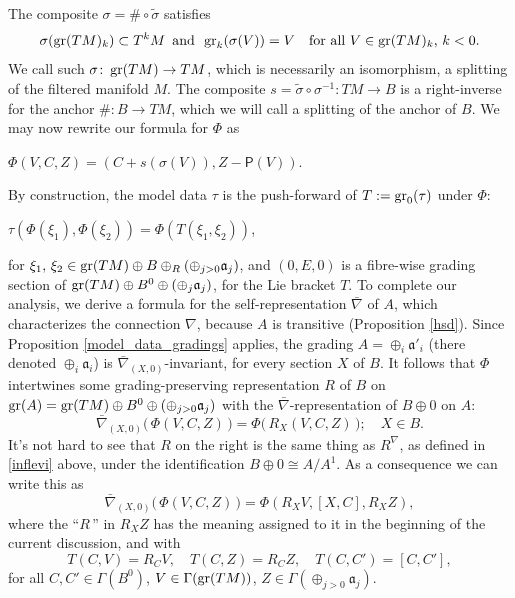 \documentclass[leqno,12pt]{amsart} %
\begin{document}
The composite $\sigma=\#\circ\tilde\sigma $ satisfies
\begin{equation*}
  \sigma(\operatorname{\operatorname{gr}}(TM)_k) \subset T^kM\enspace\text{and}\enspace
  \operatorname{\operatorname{gr}}_k(\sigma (V)) = V \quad\text{for all $V \in \operatorname{\operatorname{gr}}(TM)_k$, $k < 0$}.
\end{equation*}
We call such $\sigma \colon \operatorname{\operatorname{gr}}(TM) \rightarrow TM $, which is necessarily an
isomorphism, a {\df splitting} of the filtered manifold $M$. The composite
$s = \tilde \sigma \circ \sigma^{-1} \colon TM \rightarrow B$ is a right-inverse for the
anchor $\# \colon B \rightarrow TM$, which we will call a {\df splitting of the anchor of $B$}. We
may now rewrite our formula for $\Phi $ as
\begin{conditions}\item[{\bfseries S1.}]
  \quad $\Phi(V, C, Z) = (C + s(\sigma(V)), Z - \mathsf{P}(V))$.
\end{conditions}
By construction, the model data $\tau $ is the push-forward of $T:=\operatorname{\operatorname{gr}}_0(\tau)$ under
$\Phi $:
\begin{conditions}\item[{\bfseries S2.}]
  \quad $\tau(\Phi(\xi_1), \Phi(\xi_2)) = \Phi(T(\xi_1, \xi_2))$,
\end{conditions}
for $\xi_1,\,\xi_2 \in \operatorname{\operatorname{gr}}(TM)\oplus B \oplus_R(\oplus_{j>0}{\mathfrak a}_j)$, and
$(0, E, 0)$ is a fibre-wise grading section of
$\operatorname{\operatorname{gr}}(TM) \oplus B^0 \oplus (\oplus_j {\mathfrak a}_j)$, for the Lie bracket $T$.  To
complete our analysis, we derive a formula for the self-representation $\bar\nabla $ of
$A$, which characterizes the connection $\nabla$, because $A$ is transitive (Proposition
\ref{hsd}).  Since Proposition \ref{model_data_gradings} applies, the grading
$A=\oplus_i {\mathfrak a}'_i$ (there denoted $\oplus_i {\mathfrak a}_i$) is
$\bar\nabla_{(X,0)}$-invariant, for every section $X$ of $B$.  It follows that $\Phi $
intertwines some grading-preserving representation $R$ of $B$ on
$\operatorname{\operatorname{gr}}(A)=\operatorname{\operatorname{gr}}(TM)\oplus B^0 \oplus (\oplus_{j>0}{\mathfrak a}_j)$ with the
$\bar\nabla$-representation of $B \oplus 0$ on $A$:
\begin{equation*}
  \bar\nabla_{(X, 0)} \Big(\,\Phi(V,C,Z)\,\Big) = \Phi\Big(\,R_X(V, C, Z)\,\Big);\quad X \in B.
\end{equation*}
It's not hard to see that $R$ on the right is the same thing as $R^\nabla $, as defined in
\ref{inflevi} above, under the identification $B \oplus 0 \cong A/A^1$. As a consequence
we can write this as
\begin{equation}
    \bar\nabla_{(X, 0)} \Big(\,\Phi(V,C,Z)\,\Big)=\Phi(R_XV, [X,C], R_X Z),\label{groof}
\end{equation}
where the ``$R$\,'' in $R_XZ$ has the meaning assigned to it in the beginning of the
current discussion, and with
\begin{equation*}
  T(C, V) = R_C V,\quad
  T(C, Z) = R_C Z,\quad
  T(C, C') = [C,C'],
\end{equation*}
for all $C,C'\in\Gamma(B^0)$, $V\in \Gamma(\operatorname{\operatorname{gr}}(TM))$,
$Z \in \Gamma(\oplus_{j>0} {\mathfrak a}_j)$.
\end{document}

